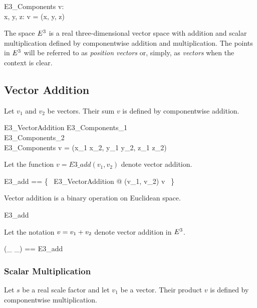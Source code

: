 \documentclass{amsart}
\begin{document}
\begin{schema}{E3\_Components}
	v: \Ethree \\
	x, y, z: \R
\where
	v = (x, y, z)
\end{schema}

The space $E^3$ is a real three-dimensional vector space with addition and scalar multiplication
defined by componentwise addition and multiplication.
The points in $E^3$ will be referred to as \textit{position vectors} or, simply, as \textit{vectors} when the context is clear.

\subsection{Vector Addition}

Let $v_1$ and $v_2$ be vectors. Their sum $v$ is defined by componentwise addition.

\begin{schema}{E3\_VectorAddition}
	E3\_Components_1 \\
	E3\_Components_2 \\
	E3\_Components
\where
	v = (x_1 \addR x_2, y_1 \addR y_2, z_1 \addR z_2)
\end{schema}

Let the function $v = E3\_add(v_1, v_2)$ denote vector addition.

\begin{zed}
	E3\_add == \{~ E3\_VectorAddition @ (v_1, v_2) \mapsto v ~\}
\end{zed}

\begin{remark} 
Vector addition is a binary operation on Euclidean space.
\begin{zed}
	E3\_add \in \Ethree \cross \Ethree \fun \Ethree
\end{zed}
\end{remark}

Let the notation $v = v_1 \mathbin{+} v_2$ denote vector addition in $E^3$.

\begin{zed}
	(\_ \addEthree \_) == E3\_add
\end{zed}

\subsubsection{Scalar Multiplication}

Let $s$ be a real scale factor and let $v_1$ be a vector. Their product $v$ is defined by componentwise multiplication.
\end{document}
